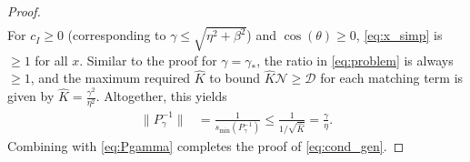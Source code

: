 \documentclass[a4paper,10pt]{article}
\begin{document}
\begin{proof}
\begin{align}
\end{align}
%
For $c_I\geq 0$ (corresponding to $\gamma \leq\sqrt{\eta^2+\beta^2}$)
and $\cos(\theta)\geq 0$, \eqref{eq:x_simp} is $\geq 1$ for all $x$.
%
Similar to the proof for $\gamma = \gamma_*$, the ratio in \eqref{eq:problem}
is always $\geq 1$, and the maximum required $\widehat{K}$ to bound
$\widehat{K}\mathcal{N} \geq \mathcal{D}$ for each matching term is
given by $\widehat{K} = \tfrac{\gamma^2}{\eta^2}$. Altogether,
this yields
%
\begin{align*}
\|P_{\gamma}^{-1}\| & = \frac{1}{s_{\min}(P_{\gamma}^{-1})} 
	\leq \frac{1}{1/\sqrt{\widehat{K}}} 
	= \frac{\gamma}{\eta}.
\end{align*}
%
Combining with \eqref{eq:Pgamma} completes the proof of \eqref{eq:cond_gen}.
\end{proof}
%
\end{document}
